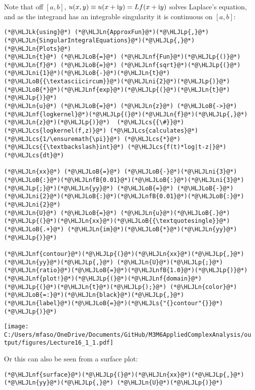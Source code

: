 \documentclass[12pt,a4paper]{article}
\newcommand{\HLJLk}[1]{\textcolor[RGB]{148,91,176}{\textbf{#1}}}
\newcommand{\HLJLn}[1]{#1}
\newcommand{\HLJLnf}[1]{\textcolor[RGB]{66,102,213}{#1}}
\newcommand{\HLJLs}[1]{\textcolor[RGB]{201,61,57}{#1}}
\newcommand{\HLJLnfB}[1]{\textcolor[RGB]{59,151,46}{#1}}
\newcommand{\HLJLni}[1]{\textcolor[RGB]{59,151,46}{#1}}
\newcommand{\HLJLoB}[1]{\textcolor[RGB]{102,102,102}{\textbf{#1}}}
\newcommand{\HLJLp}[1]{#1}
\newcommand{\HLJLcs}[1]{\textcolor[RGB]{153,153,119}{\textit{#1}}}
\def\I{ {\rm i} }
\begin{document}
Note that off $[a,b]$, $u(x,y) \equiv u(x+\I y) = L f(x+\I y)$ solves Laplace's equation, and as the integrand has an integrable singularity it is continuous on $[a,b]$:


\begin{lstlisting}
(*@\HLJLk{using}@*) (*@\HLJLn{ApproxFun}@*)(*@\HLJLp{,}@*) (*@\HLJLn{SingularIntegralEquations}@*)(*@\HLJLp{,}@*) (*@\HLJLn{Plots}@*)
(*@\HLJLn{t}@*) (*@\HLJLoB{=}@*) (*@\HLJLnf{Fun}@*)(*@\HLJLp{()}@*)
(*@\HLJLn{f}@*) (*@\HLJLoB{=}@*) (*@\HLJLnf{sqrt}@*)(*@\HLJLp{(}@*)(*@\HLJLni{1}@*)(*@\HLJLoB{-}@*)(*@\HLJLn{t}@*)(*@\HLJLoB{{\textasciicircum}}@*)(*@\HLJLni{2}@*)(*@\HLJLp{)}@*)(*@\HLJLoB{*}@*)(*@\HLJLnf{exp}@*)(*@\HLJLp{(}@*)(*@\HLJLn{t}@*)(*@\HLJLp{)}@*)
(*@\HLJLn{u}@*) (*@\HLJLoB{=}@*) (*@\HLJLn{z}@*) (*@\HLJLoB{->}@*) (*@\HLJLnf{logkernel}@*)(*@\HLJLp{(}@*)(*@\HLJLn{f}@*)(*@\HLJLp{,}@*) (*@\HLJLn{z}@*)(*@\HLJLp{)}@*)  (*@\HLJLcs{{\#}}@*) (*@\HLJLcs{logkernel(f,z)}@*) (*@\HLJLcs{calculates}@*) (*@\HLJLcs{1/\ensuremath{\pi}}@*) (*@\HLJLcs{*}@*) (*@\HLJLcs{{\textbackslash}int}@*) (*@\HLJLcs{f(t)*log|t-z|}@*) (*@\HLJLcs{dt}@*)

(*@\HLJLn{xx}@*) (*@\HLJLoB{=}@*) (*@\HLJLoB{-}@*)(*@\HLJLni{3}@*)(*@\HLJLoB{:}@*)(*@\HLJLnfB{0.01}@*)(*@\HLJLoB{:}@*)(*@\HLJLni{3}@*)(*@\HLJLp{;}@*)(*@\HLJLn{yy}@*) (*@\HLJLoB{=}@*) (*@\HLJLoB{-}@*)(*@\HLJLni{2}@*)(*@\HLJLoB{:}@*)(*@\HLJLnfB{0.01}@*)(*@\HLJLoB{:}@*)(*@\HLJLni{2}@*)
(*@\HLJLn{U}@*) (*@\HLJLoB{=}@*) (*@\HLJLn{u}@*)(*@\HLJLoB{.}@*)(*@\HLJLp{(}@*)(*@\HLJLn{xx}@*)(*@\HLJLoB{{\textquotesingle}}@*) (*@\HLJLoB{.+}@*) (*@\HLJLn{im}@*)(*@\HLJLoB{*}@*)(*@\HLJLn{yy}@*)(*@\HLJLp{)}@*)

(*@\HLJLnf{contour}@*)(*@\HLJLp{(}@*)(*@\HLJLn{xx}@*)(*@\HLJLp{,}@*) (*@\HLJLn{yy}@*)(*@\HLJLp{,}@*) (*@\HLJLn{U}@*)(*@\HLJLp{;}@*)(*@\HLJLn{ratio}@*)(*@\HLJLoB{=}@*)(*@\HLJLnfB{1.0}@*)(*@\HLJLp{)}@*)
(*@\HLJLnf{plot!}@*)(*@\HLJLp{(}@*)(*@\HLJLnf{domain}@*)(*@\HLJLp{(}@*)(*@\HLJLn{t}@*)(*@\HLJLp{);}@*) (*@\HLJLn{color}@*)(*@\HLJLoB{=:}@*)(*@\HLJLn{black}@*)(*@\HLJLp{,}@*) (*@\HLJLn{label}@*)(*@\HLJLoB{=}@*)(*@\HLJLs{"{}contour"{}}@*)(*@\HLJLp{)}@*)
\end{lstlisting}

\texttt{[image: C:/Users/mfaso/OneDrive/Documents/GitHub/M3M6AppliedComplexAnalysis/output/figures/Lecture16\_1\_1.pdf]}

Or this can also be seen from a surface plot:


\begin{lstlisting}
(*@\HLJLnf{surface}@*)(*@\HLJLp{(}@*)(*@\HLJLn{xx}@*)(*@\HLJLp{,}@*) (*@\HLJLn{yy}@*)(*@\HLJLp{,}@*) (*@\HLJLn{U}@*)(*@\HLJLp{)}@*)
\end{lstlisting}
\end{document}
